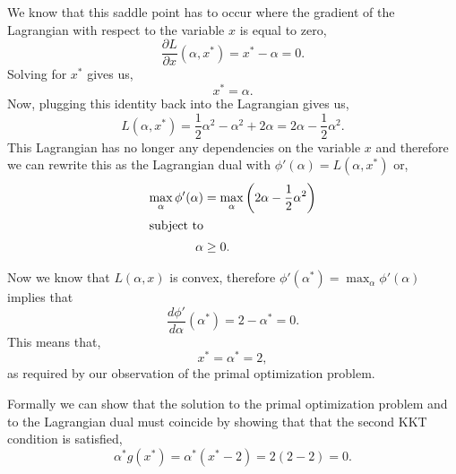 \documentclass[a4paper,blends,pdf,colorBG,slideColor]{prosper}
\begin{document}
\small
We know that this saddle point has to occur where the gradient of the Lagrangian with
respect to the variable $x$ is equal to zero, 
\begin{equation*}
\frac{\partial L}{\partial x} (\alpha, x^*)=  x^* - \alpha = 0.
\end{equation*}
Solving for $x^*$ gives us,
\begin{equation*}
 x^* = \alpha.
\end{equation*}
Now, plugging this identity back into the Lagrangian
gives us,
\begin{equation*}
L(\alpha,x^*) = \frac{1}{2}\alpha^2 - \alpha^2 + 2\alpha = 2\alpha - \frac{1}{2}\alpha^2.
\end{equation*}
This Lagrangian has no longer any dependencies on the variable $x$ and therefore
we can rewrite this as the Lagrangian dual with $\phi'(\alpha) = L(\alpha,x^*)$ or,
\begin{align*}
\max_{\alpha} \phi'(\alpha)& = \max_{\alpha} \left(2\alpha - \frac{1}{2}\alpha^2 \right )
\\
\intertext{subject to}
\alpha &\ge 0.
\end{align*}

\es

Now we know that $L(\alpha,x)$ is convex, therefore $\phi'(\alpha^*) = \max_\alpha \phi'(\alpha)$
implies that
\begin{equation*}
\frac{d\phi'}{d\alpha}(\alpha^*)= 2 - \alpha^*= 0.
\end{equation*}
This means that,
\begin{equation*}
x^* = \alpha^* = 2,
\end{equation*}
as required by our observation of the primal optimization problem.

Formally we can show that the solution to the primal optimization problem and to the Lagrangian dual
must 
coincide by showing that that the second KKT condition is satisfied,
\begin{equation*}
\alpha^*g(x^*) = \alpha^*(x^* - 2) = 2(2-2) = 0.
\end{equation*}

\es
\end{document}
